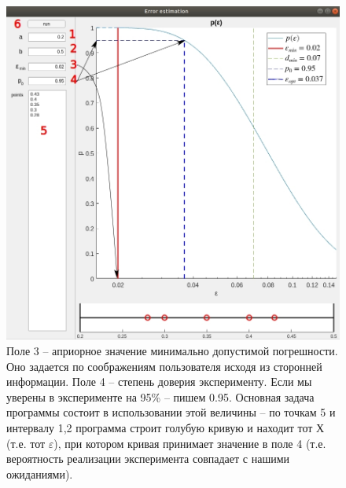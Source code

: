 \documentclass[a4paper,12pt]{article} %
\begin{document}
\begin{figure}[h!]
\begin{center}
\includegraphics[width=1\textwidth]{./pics/whole_window_34}
\end{center}
\caption{Поле 3 -- априорное значение минимально допустимой погрешности. Оно задается по соображениям пользователя исходя из сторонней информации. Поле 4 -- степень доверия эксперименту. Если мы уверены в эксперименте на 95\% -- пишем 0.95. Основная задача программы состоит в использовании этой величины -- по точкам 5 и интервалу 1,2 программа строит голубую кривую и находит тот Х (т.е. тот $\varepsilon$), при котором кривая принимает значение в поле 4 (т.е. вероятность реализации эксперимента совпадает с нашими ожиданиями).} 
\label{img:whole_34}
\end{figure}

\newpage
\end{document}
